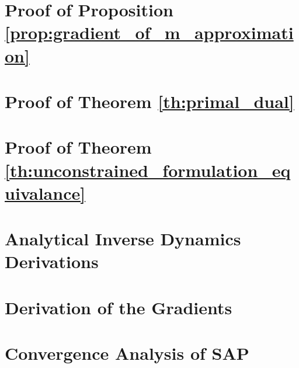 
\section{Proof of Proposition \ref{prop:gradient_of_m_approximation}}
\label{app:gradient_of_m_approximation}


\section{Proof of Theorem \ref{th:primal_dual}}
\label{app:primal_dual_proof}


\section{Proof of Theorem \ref{th:unconstrained_formulation_equivalance}}
\label{app:unconstrained_formulation_equivalance}


\section{Analytical Inverse Dynamics Derivations}
\label{app:analytical_inverse_dynamics_derivations}


\section{Derivation of the Gradients}
\label{app:gradients_derivation}


\section{Convergence Analysis of SAP}
\label{app:sap_converge}


